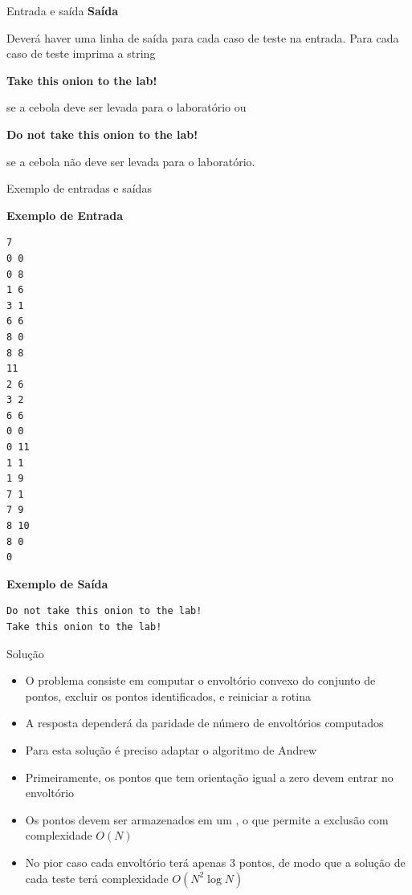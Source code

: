 \begin{frame}[fragile]{Entrada e saída}
\textbf{Saída}

Deverá haver uma linha de saída para cada caso de teste na entrada. Para cada caso de teste imprima a string

\textbf{Take this onion to the lab!}

se a cebola deve ser levada para o laboratório ou

\textbf{Do not take this onion to the lab!}

se a cebola não deve ser levada para o laboratório.

\end{frame}

\begin{frame}[fragile]{Exemplo de entradas e saídas}

\begin{scriptsize}
\begin{minipage}[t]{0.6\textwidth}
\textbf{Exemplo de Entrada}
\begin{verbatim}
7
0 0
0 8
1 6
3 1
6 6
8 0
8 8
11
2 6
3 2
6 6
0 0
0 11
1 1
1 9
7 1
7 9
8 10
8 0
0
\end{verbatim}
\end{minipage}
\begin{minipage}[t]{0.35\textwidth}
\textbf{Exemplo de Saída}
\begin{verbatim}
Do not take this onion to the lab!
Take this onion to the lab!
\end{verbatim}
\end{minipage}
\end{scriptsize}

\end{frame}

\begin{frame}[fragile]{Solução}

    \begin{itemize}
        \item O problema consiste em computar o envoltório convexo do conjunto de pontos,
            excluir os pontos identificados, e reiniciar a rotina

        \item A resposta dependerá da paridade de número de envoltórios computados

        \item Para esta solução é preciso adaptar o algoritmo de Andrew

        \item Primeiramente, os pontos que tem orientação igual a zero devem entrar no
            envoltório

        \item Os pontos devem ser armazenados em um , o que permite a exclusão
            com complexidade $O(N)$

        \item No pior caso cada envoltório terá apenas 3 pontos, de modo que a solução de cada
            teste terá complexidade $O(N^2\log N)$
    \end{itemize}

\end{frame}

